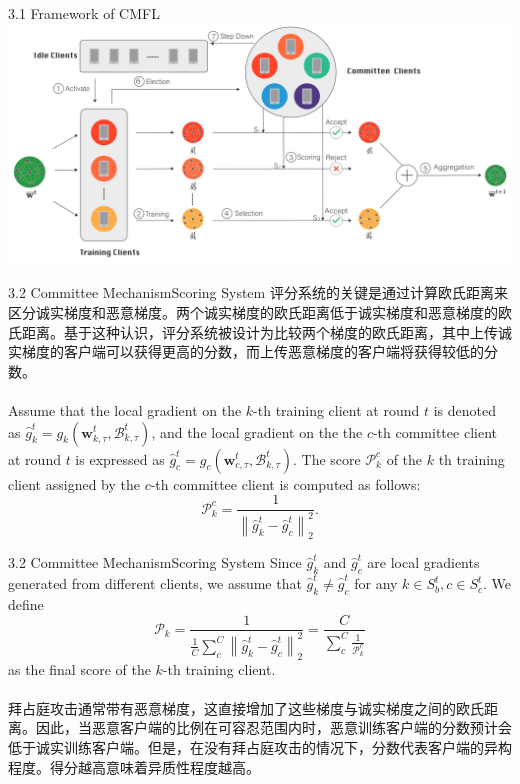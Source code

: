\documentclass{sintefbeamer}
\theoremstyle{definition}
\begin{document}
\begin{frame}{3.1 Framework of CMFL}
\centering
\includegraphics[width=1\textwidth]{images/cmfl_framework}

\end{frame}

\begin{frame}{3.2 Committee Mechanism}{Scoring System}
评分系统的关键是通过计算欧氏距离来区分诚实梯度和恶意梯度。两个诚实梯度的欧氏距离低于诚实梯度和恶意梯度的欧氏距离。基于这种认识，评分系统被设计为比较两个梯度的欧氏距离，其中上传诚实梯度的客户端可以获得更高的分数，而上传恶意梯度的客户端将获得较低的分数。
\\ \hspace*{\fill} \\
Assume that the local gradient on the $k$-th training client at round $t$ is denoted as $\hat{g}_k^t=g_k\left(\mathbf{w}_{k, \tau}^t, \mathcal{B}_{k, \tau}^t\right)$, and the local gradient on the the $c$-th committee client at round $t$ is expressed as $\hat{g}_c^t=g_c\left(\mathbf{w}_{c, \tau}^t, \mathcal{B}_{k, \tau}^t\right)$. The score $\mathcal{P}_k^c$ of the $k$ th training client assigned by the $c$-th committee client is computed as follows:
$$
\mathcal{P}_k^c=\frac{1}{\left\|\hat{g}_k^t-\hat{g}_c^t\right\|_2^2} .
$$
\end{frame}

\begin{frame}{3.2 Committee Mechanism}{Scoring System}
Since $\hat{g}_k^t$ and $\hat{g}_c^t$ are local gradients generated from different clients, we assume that $\hat{g}_k^t \neq \hat{g}_c^t$ for any $k \in S_b^t, c \in S_c^t$. We define 
$$
\mathcal{P}_k=\frac{1}{\frac{1}{C} \sum_c^C\left\|\hat{g}_k^t-\hat{g}_c^t\right\|_2^2}=\frac{C}{\sum_c^C \frac{1}{\mathcal{P}_k^c}}
$$
as the final score of the $k$-th training client. 
\\ \hspace*{\fill} \\
拜占庭攻击通常带有恶意梯度，这直接增加了这些梯度与诚实梯度之间的欧氏距离。因此，当恶意客户端的比例在可容忍范围内时，恶意训练客户端的分数预计会低于诚实训练客户端。但是，在没有拜占庭攻击的情况下，分数代表客户端的异构程度。得分越高意味着异质性程度越高。
\end{frame}
\end{document}
